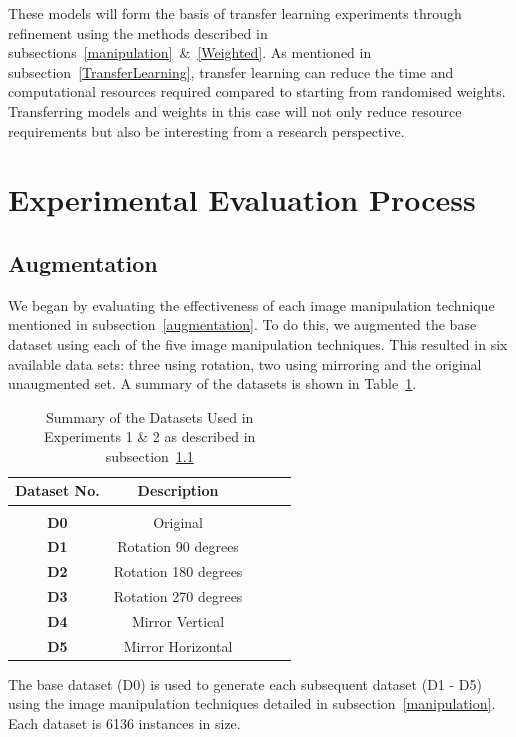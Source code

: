 These models will form the basis of transfer learning experiments through refinement using the methods described in subsections~\ref{manipulation}~\&~\ref{Weighted}. As mentioned in subsection~\ref{TransferLearning}, transfer learning can reduce the time and computational resources required compared to starting from randomised weights. Transferring models and weights in this case will not only reduce resource requirements but also be interesting from a research perspective. 

\section{Experimental Evaluation Process} 

\subsection{Augmentation} \label{augmentMethod}

We began by evaluating the effectiveness of each image manipulation technique mentioned in subsection~\ref{augmentation}. To do this, we augmented the base dataset using each of the five image manipulation techniques. This resulted in six available data sets: three using rotation, two using mirroring and the original unaugmented set. A summary of the datasets is shown in Table~\ref{tab:Augdatasets}.
\\

\begin{table}[h!]
	 \begin{center}
		
		\begin{tabular}{c|c|c|r|c} %
			\textbf{Dataset No.} & \textbf{Description}  \\
			
			\hline
			& \\
			\textbf{D0} &  Original \\
			\textbf{D1}   & Rotation 90 degrees \\ 
			\textbf{D2}  & Rotation 180 degrees  \\
			\textbf{D3} &  Rotation 270 degrees  \\
			\textbf{D4} &  Mirror Vertical  \\
			\textbf{D5} &  Mirror Horizontal
			\\ 
			
		\end{tabular}
		\caption{Summary of the Datasets Used in Experiments 1 \& 2 as described in subsection~\ref{augmentMethod}} {The base dataset (D0) is used to generate each subsequent dataset (D1 - D5) using the image manipulation techniques detailed in subsection~\ref{manipulation}. Each dataset is 6136 instances in size. }
		\label{tab:Augdatasets}
		 \end{center}
\end{table}

